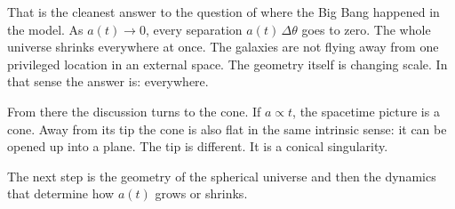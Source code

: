 That is the cleanest answer to the question of where the Big Bang happened in the model. As \(a(t)\to 0\), every separation \(a(t)\,\Delta\theta\) goes to zero. The whole universe shrinks everywhere at once. The galaxies are not flying away from one privileged location in an external space. The geometry itself is changing scale. In that sense the answer is: everywhere.

\begin{classroomqa}
\end{classroomqa}

From there the discussion turns to the cone. If \(a\propto t\), the spacetime picture is a cone. Away from its tip the cone is also flat in the same intrinsic sense: it can be opened up into a plane. The tip is different. It is a conical singularity.

The next step is the geometry of the spherical universe and then the dynamics that determine how \(a(t)\) grows or shrinks.
